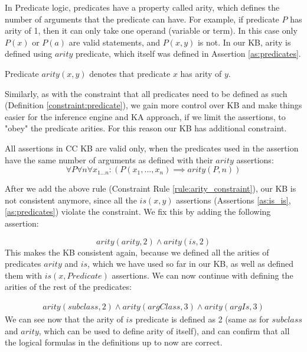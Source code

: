 In Predicate logic, predicates have a property called arity, which defines 
the number of arguments that the predicate can have. For example, if predicate
$P$ has arity of 1, then it can only take one operand (variable or term). In 
this case only $P(x)$ or $P(a)$ are valid statements, and $P(x,y)$ is not.
In our KB, arity is defined using $arity$ predicate, which itself was defined
in Assertion \ref{as:predicates}.

\begin{definition}\label{def:arity}
Predicate $arity(x,y)$ denotes that predicate $x$ has arity of $y$.
\end{definition}

Similarly, as with the constraint that all predicates need to be defined as
such (Definition \autoref{constraint:predicate}), we gain more control over 
KB and make things easier for the inference engine and KA approach, if we 
limit the assertions, to "obey" the predicate arities. For this reason our KB
has additional constraint.

\begin{definition}\label{constraint:arity}
All assertions in CC KB are valid only, when the predicates used in the 
assertion have the same number of arguments as defined with their $arity$ 
assertions:
\begin{equation}\label{rule:arity_constraint}
\forall P \forall n \forall x_{1...n}:(P(x_1,...,x_n) \implies arity(P,n))
\end{equation}
\end{definition}

After we add the above rule (Constraint Rule \ref{rule:arity_constraint}), our 
KB is not consistent anymore, since all the $is(x,y)$ assertions (Assertions 
\ref{as:is_is}, \ref{as:predicates}) violate the constraint. We fix this by 
adding the following assertion:

\begin{equation}\label{as:arity_is}
arity(arity,2) \land arity(is,2)
\end{equation}
This makes the KB consistent again, because we defined all the arities of
predicates $arity$ and $is$, which we have used so far in our KB, as well as 
defined them with $is(x, Predicate)$ assertions. We can now continue with 
defining the arities of the rest of the predicates:

\begin{equation}\label{as:arity_predicates}
\begin{gathered}
arity(subclass, 2) \land arity(argClass,3) \land arity(argIs,3)
\end {gathered}
\end{equation}
We can see now that the arity of $is$ predicate is defined as 2 (same as for 
$subclass$ and $arity$, which can be used to define arity of itself), and can 
confirm that all the logical formulas in the definitions up to now are correct.

